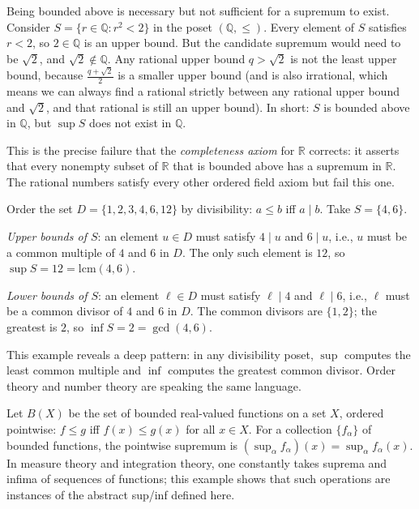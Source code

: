 \begin{remark*}
\label{rem:sup-nonexistence}
Being bounded above is necessary but not sufficient for a supremum to exist.
Consider $S = \{r \in \mathbb{Q} : r^2 < 2\}$ in the poset $(\mathbb{Q},\leq)$.
Every element of $S$ satisfies $r < 2$, so $2 \in \mathbb{Q}$ is an upper
bound.  But the candidate supremum would need to be $\sqrt{2}$, and
$\sqrt{2} \notin \mathbb{Q}$.  Any rational upper bound $q > \sqrt{2}$ is not
the least upper bound, because $\frac{q + \sqrt{2}}{2}$ is a smaller upper
bound (and is also irrational, which means we can always find a rational
strictly between any rational upper bound and $\sqrt{2}$, and that rational is
still an upper bound).  In short: $S$ is bounded above in $\mathbb{Q}$, but
$\sup S$ does not exist in $\mathbb{Q}$.

This is the precise failure that the \emph{completeness axiom} for
$\mathbb{R}$ corrects: it asserts that every nonempty subset of $\mathbb{R}$
that is bounded above has a supremum in $\mathbb{R}$.  The rational numbers
satisfy every other ordered field axiom but fail this one.
\end{remark*}


\begin{example*}
\label{ex:sup-divisibility}
Order the set $D = \{1,2,3,4,6,12\}$ by divisibility: $a \leq b$ iff $a \mid b$.
Take $S = \{4, 6\}$.

\emph{Upper bounds of $S$}: an element $u \in D$ must satisfy $4 \mid u$ and
$6 \mid u$, i.e., $u$ must be a common multiple of $4$ and $6$ in $D$.
The only such element is $12$, so $\sup S = 12 = \mathrm{lcm}(4,6)$.

\emph{Lower bounds of $S$}: an element $\ell \in D$ must satisfy $\ell \mid 4$
and $\ell \mid 6$, i.e., $\ell$ must be a common divisor of $4$ and $6$ in $D$.
The common divisors are $\{1,2\}$; the greatest is $2$, so $\inf S = 2 =
\gcd(4,6)$.

This example reveals a deep pattern: in any divisibility poset, $\sup$ computes
the least common multiple and $\inf$ computes the greatest common divisor.
Order theory and number theory are speaking the same language.
\end{example*}

\begin{example*}
\label{ex:sup-functions}
Let $B(X)$ be the set of bounded real-valued functions on a set $X$, ordered
pointwise: $f \leq g$ iff $f(x) \leq g(x)$ for all $x \in X$.  For a
collection $\{f_\alpha\}$ of bounded functions, the pointwise supremum is
$(\sup_\alpha f_\alpha)(x) = \sup_\alpha f_\alpha(x)$.  In measure theory and
integration theory, one constantly takes suprema and infima of sequences of
functions; this example shows that such operations are instances of the
abstract sup/inf defined here.
\end{example*}

